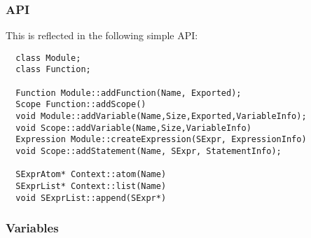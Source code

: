\subsubsection{API}
This is reflected in the following simple API:

\begin{lstlisting}
  class Module;
  class Function;

  Function Module::addFunction(Name, Exported);
  Scope Function::addScope()
  void Module::addVariable(Name,Size,Exported,VariableInfo);
  void Scope::addVariable(Name,Size,VariableInfo)
  Expression Module::createExpression(SExpr, ExpressionInfo)
  void Scope::addStatement(Name, SExpr, StatementInfo);

  SExprAtom* Context::atom(Name)
  SExprList* Context::list(Name)
  void SExprList::append(SExpr*)
\end{lstlisting}
\subsubsection{Variables}

\begin{lstlisting}
\end{lstlisting}